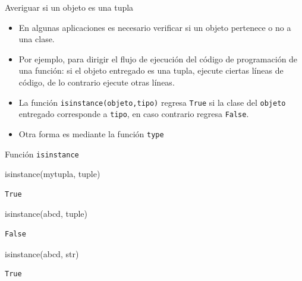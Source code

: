 \documentclass[
  ignorenonframetext,
  aspectratio=169,
  spanish,
]{beamer}
\newenvironment{Shaded}{\begin{snugshade}}{\end{snugshade}}
\newcommand{\BuiltInTok}[1]{\textcolor[rgb]{0.00,0.23,0.31}{#1}}
\newcommand{\NormalTok}[1]{\textcolor[rgb]{0.00,0.23,0.31}{#1}}
\newcommand{\StringTok}[1]{\textcolor[rgb]{0.13,0.47,0.30}{#1}}
\begin{document}
\begin{frame}[fragile]{Averiguar si un objeto es una tupla}
\label{averiguar-si-un-objeto-es-una-tupla}
\begin{itemize}
\item
  En algunas aplicaciones es necesario verificar si un objeto pertenece
  o no a una clase.
\item
  Por ejemplo, para dirigir el flujo de ejecución del código de
  programación de una función: si el objeto entregado es una tupla,
  ejecute ciertas líneas de código, de lo contrario ejecute otras
  líneas.
\item
  La función \texttt{isinstance(objeto,tipo)} regresa \texttt{True} si
  la clase del \texttt{objeto} entregado corresponde a \texttt{tipo}, en
  caso contrario regresa \texttt{False}.
\item
  Otra forma es mediante la función \texttt{type}
\end{itemize}
\end{frame}

\begin{frame}[fragile]{Función \texttt{isinstance}}
\label{funciuxf3n-isinstance}
\begin{Shaded}
\begin{Highlighting}[]
\BuiltInTok{isinstance}\NormalTok{(mytupla, }\BuiltInTok{tuple}\NormalTok{)}
\end{Highlighting}
\end{Shaded}

\begin{verbatim}
True
\end{verbatim}

\begin{Shaded}
\begin{Highlighting}[]
\BuiltInTok{isinstance}\NormalTok{(}\StringTok{\textquotesingle{}abcd\textquotesingle{}}\NormalTok{, }\BuiltInTok{tuple}\NormalTok{)}
\end{Highlighting}
\end{Shaded}

\begin{verbatim}
False
\end{verbatim}

\begin{Shaded}
\begin{Highlighting}[]
\BuiltInTok{isinstance}\NormalTok{(}\StringTok{\textquotesingle{}abcd\textquotesingle{}}\NormalTok{, }\BuiltInTok{str}\NormalTok{)}
\end{Highlighting}
\end{Shaded}

\begin{verbatim}
True
\end{verbatim}
\end{frame}
\end{document}
